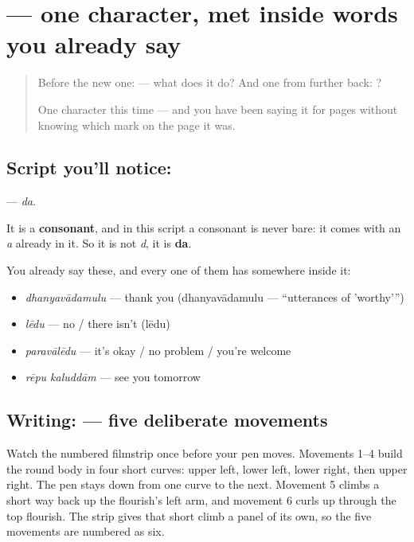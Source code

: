 \section[\texorpdfstring{\te{ద} (da)}{ద (da)}]{ — one character, met inside words you already say}

\label{lesson:TE-S116-letter-da}



\begin{quote}
Before the new one:  — what does it do? And one from further back: ?

One character this time — and you have been saying it for pages without knowing which mark on the page it was.
\end{quote}

\subsection*{Script you'll notice: }
\textbf{} — \emph{da}.

It is a \textbf{consonant}, and in this script a consonant is never bare: it comes with an \emph{a} already in it. So it is not \emph{d}, it is \textbf{da}.

You already say these, and every one of them has  somewhere inside it:

\begin{itemize}
\raggedright
  \item \textbf{} \emph{dhanyavādamulu} — thank you (dhanyavādamulu — \textquotedblleft{}utterances of 'worthy'\textquotedblright{})
  \item \textbf{} \emph{lēdu} — no / there isn't (lēdu)
  \item \textbf{} \emph{paravālēdu} — it's okay / no problem / you're welcome
  \item \textbf{ } \emph{rēpu kaluddām} — see you tomorrow
\end{itemize}

\subsection*{Writing:  — five deliberate movements}

Watch the numbered filmstrip once before your pen moves. Movements 1–4 build the round body in four short curves: upper left, lower left, lower right, then upper right. The pen stays down from one curve to the next. Movement 5 climbs a short way back up the flourish's left arm, and movement 6 curls up through the top flourish. The strip gives that short climb a panel of its own, so the five movements are numbered as six.

